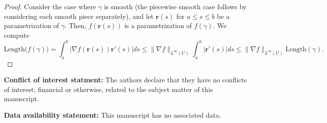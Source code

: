 \documentclass[11pt]{article}
\newcommand{\bd}{\boldsymbol}
\theoremstyle{definition}
\begin{document}
\begin{proof}
Consider the case where $\gamma$ is smooth (the piecewise smooth case follows by considering each smooth piece separately), and let $\bd{r}(s)$ for $a \le s \le b$ be a parametrization of $\gamma$. Then, $f(\bd{r}(s))$ is a parametrization of $f(\gamma)$. We compute
\begin{equation*}
\text{Length}\Big(f(\gamma)\Big) = \int_{a}^{b} |\nabla f(\bd{r}(s)) \bd{r}'(s)| ds \le \|\nabla f\|_{L^{\infty}(U)} \int_{a}^{b} |\bd{r}'(s)| ds \le \|\nabla f\|_{L^{\infty}(U)} \text{Length}(\gamma).
\end{equation*}
\end{proof}

{\bf{Conflict of interest statment:}} The authors declare that they have no conflicts of interest, financial or otherwise, related to the subject matter of this manuscript.




{\bf{Data availability statement:}} This manuscript has no associated data. 
\end{document}
